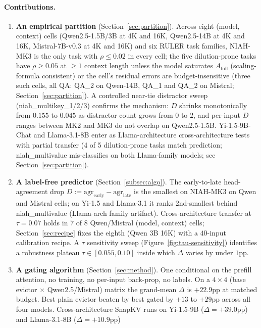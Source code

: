 \documentclass{article} %
\begin{document}
\paragraph{Contributions.}
\begin{enumerate}
  \item \textbf{An empirical partition} (Section~\ref{sec:partition}). Across
  eight (model, context) cells (Qwen2.5-1.5B/3B at 4K and 16K, Qwen2.5-14B at
  4K and 16K, Mistral-7B-v0.3 at 4K and 16K) and six RULER task families,
  NIAH-MK3 is the only task with $\rho \le 0.02$ in every cell; the five
  dilution-prone tasks have $\rho \ge 0.05$ at $\geq 1$ context length unless
  the model saturates $A_{\mathrm{full}}$ (scaling-formula consistent) or the
  cell's residual errors are budget-insensitive (three such cells, all QA:
  QA\_2 on Qwen-14B, QA\_1 and QA\_2 on Mistral;
  Section~\ref{sec:partition}). A
  controlled near-tie distractor sweep (niah\_multikey\_1/2/3) confirms the
  mechanism: $D$ shrinks monotonically from $0.155$ to $0.045$ as distractor
  count grows from $0$ to $2$, and per-input $D$ ranges between MK2 and MK3
  do not overlap on Qwen2.5-1.5B. Yi-1.5-9B-Chat and Llama-3.1-8B enter as
  Llama-architecture cross-architecture tests with partial transfer (4 of 5
  dilution-prone tasks match prediction; niah\_multivalue mis-classifies on
  both Llama-family models; see Section~\ref{sec:partition}).
  \item \textbf{A label-free predictor} (Section~\ref{subsec:algo}). The
  early-to-late head-agreement drop $D := \mathrm{agr}_{\text{early}} -
  \mathrm{agr}_{\text{late}}$ is the smallest on NIAH-MK3 on Qwen and Mistral
  cells; on Yi-1.5 and Llama-3.1 it ranks 2nd-smallest behind niah\_multivalue
  (Llama-arch family artifact). Cross-architecture transfer at $\tau = 0.07$
  holds in $7$ of $8$ Qwen/Mistral (model, context) cells; Section~\ref{sec:recipe}
  fixes the eighth (Qwen 3B 16K) with a $40$-input calibration recipe. A $\tau$
  sensitivity sweep (Figure~\ref{fig:tau-sensitivity}) identifies a robustness
  plateau $\tau \in [0.055, 0.10]$ inside which $\Delta$ varies by under
  $1$pp.
  \item \textbf{A gating algorithm} (Section~\ref{sec:method}). One conditional
  on the prefill attention, no training, no per-input back-prop, no labels. On a
  $4 \times 4$ (base evictor $\times$ Qwen2.5/Mistral) matrix the grand-mean
  $\Delta$ is $+22.9$pp at matched budget. Best plain evictor beaten by best
  gated by $+13$ to $+29$pp across all four models. Cross-architecture SnapKV
  runs on Yi-1.5-9B ($\Delta = +39.0$pp) and Llama-3.1-8B ($\Delta = +10.9$pp)

\end{enumerate}
\end{document}
